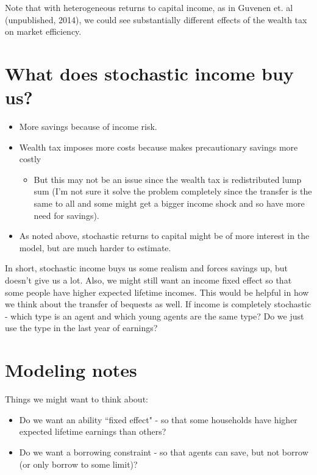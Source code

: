 \documentclass[article,11pt,letterpaper,fleqn]{article}
\theoremstyle{definition}
\numberwithin{equation}{section}
\begin{document}
Note that with heterogeneous returns to capital income, as in Guvenen et. al (unpublished, 2014), we could see substantially different effects of the wealth tax on market efficiency.

\section{What does stochastic income buy us?}

\begin{itemize}
\item More savings because of income risk.
\item Wealth tax imposes more costs because makes precautionary savings more costly 
	\begin{itemize}
	\item But this may not be an issue since the wealth tax is redistributed lump sum (I'm not sure it solve the problem completely since the transfer is the same to all and some might get a bigger income shock and so have more need for savings).
	\end{itemize}
\item As noted above, stochastic returns to capital might be of more interest in the model, but are much harder to estimate.
\end{itemize}

In short, stochastic income buys us some realism and forces savings up, but doesn't give us a lot.  Also, we might still want an income fixed effect so that some people have higher expected lifetime incomes.  This would be helpful in how we think about the transfer of bequests as well.  If income is completely stochastic - which type is an agent and which young agents are the same type?  Do we just use the type in the last year of earnings?


\section{Modeling notes}

Things we might want to think about:
\begin{itemize}
\item Do we want an ability ``fixed effect" - so that some households have higher expected lifetime earnings than others?
\item Do we want a borrowing constraint - so that agents can save, but not borrow (or only borrow to some limit)?
\end{itemize}
\end{document}

